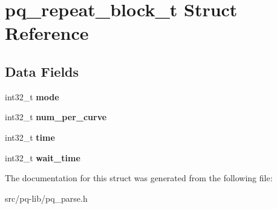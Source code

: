 \hypertarget{structpq__repeat__block__t}{}\section{pq\+\_\+repeat\+\_\+block\+\_\+t Struct Reference}
\label{structpq__repeat__block__t}
\subsection*{Data Fields}
\begin{DoxyCompactItemize}
\item 
\hypertarget{structpq__repeat__block__t_a91e114630d03f8ad8832f28a3b960eb5}{}int32\+\_\+t {\bfseries mode}\label{structpq__repeat__block__t_a91e114630d03f8ad8832f28a3b960eb5}

\item 
\hypertarget{structpq__repeat__block__t_a18d2ca006517faa9f9a22a44073dd62f}{}int32\+\_\+t {\bfseries num\+\_\+per\+\_\+curve}\label{structpq__repeat__block__t_a18d2ca006517faa9f9a22a44073dd62f}

\item 
\hypertarget{structpq__repeat__block__t_af490db52cf880fe2690000e907e3bd5e}{}int32\+\_\+t {\bfseries time}\label{structpq__repeat__block__t_af490db52cf880fe2690000e907e3bd5e}

\item 
\hypertarget{structpq__repeat__block__t_ade737000e8e181d6b14e2f61c0289997}{}int32\+\_\+t {\bfseries wait\+\_\+time}\label{structpq__repeat__block__t_ade737000e8e181d6b14e2f61c0289997}

\end{DoxyCompactItemize}


The documentation for this struct was generated from the following file\+:\begin{DoxyCompactItemize}
\item 
src/pq-\/lib/pq\+\_\+parse.\+h\end{DoxyCompactItemize}
